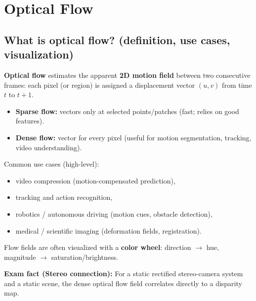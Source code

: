 \documentclass[11pt,a4paper]{article}
\begin{document}
\section{Optical Flow}

\subsection{What is optical flow? (definition, use cases, visualization)}

\begin{defbox}
\textbf{Optical flow} estimates the apparent \textbf{2D motion field} between two consecutive frames:
each pixel (or region) is assigned a displacement vector $(u,v)$ from time $t$ to $t+1$.
\end{defbox}

\begin{itemize}
  \item \textbf{Sparse flow:} vectors only at selected points/patches (fast; relies on good features).
  \item \textbf{Dense flow:} vector for every pixel (useful for motion segmentation, tracking, video understanding).
\end{itemize}

Common use cases (high-level):
\begin{itemize}
  \item video compression (motion-compensated prediction),
  \item tracking and action recognition,
  \item robotics / autonomous driving (motion cues, obstacle detection),
  \item medical / scientific imaging (deformation fields, registration).
\end{itemize}

\begin{notebox}
Flow fields are often visualized with a \textbf{color wheel}: direction $\rightarrow$ hue, magnitude $\rightarrow$ saturation/brightness.
\end{notebox}

\begin{notebox}
\textbf{Exam fact (Stereo connection):} For a static rectified stereo-camera system and a static scene, the dense optical flow field correlates directly to a disparity map.
\end{notebox}
\end{document}
